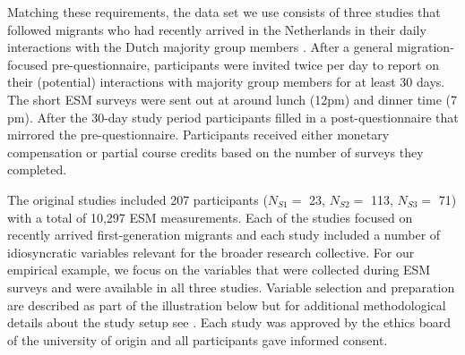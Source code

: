 Matching these requirements, the data set we use consists of three
studies that followed migrants who had recently arrived in the
Netherlands in their daily interactions with the Dutch majority group
members \citep[for the data set see][]{Kreienkamp2022b}. After a general
migration-focused pre-questionnaire, participants were invited twice per
day to report on their (potential) interactions with majority group
members for at least 30 days. The short ESM surveys were sent out at
around lunch (12pm) and dinner time (7 pm). After the 30-day study
period participants filled in a post-questionnaire that mirrored the
pre-questionnaire. Participants received either monetary compensation or
partial course credits based on the number of surveys they completed.

The original studies included 207 participants (\(N_{S1}=\) 23,
\(N_{S2}=\) 113, \(N_{S3}=\) 71) with a total of 10,297 ESM
measurements. Each of the studies focused on recently arrived
first-generation migrants and each study included a number of
idiosyncratic variables relevant for the broader research collective.
For our empirical example, we focus on the variables that were collected
during ESM surveys and were available in all three studies. Variable
selection and preparation are described as part of the illustration
below but for additional methodological details about the study setup
see \citet[][]{Kreienkamp2022b}. Each study was approved by the ethics
board of the university of origin and all participants gave informed
consent.

